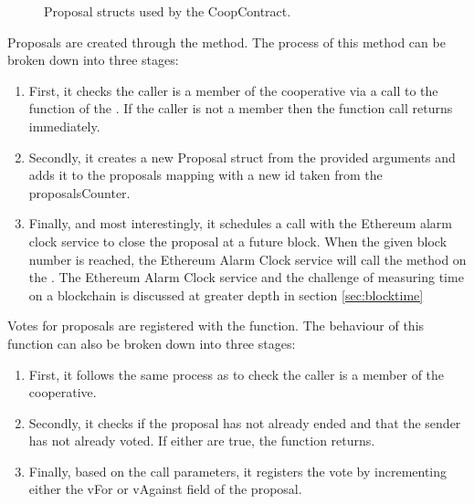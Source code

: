 \begin{figure}
\centering
{}
\decoRule
\caption[Proposal Structs in CoopContract]{Proposal structs used by the CoopContract.}
\label{fig:ProposalStructs}
\end{figure}

Proposals are created through the  method. The process of this method can be broken down into three stages: 
\begin{enumerate}
\item First, it checks the caller is a member of the cooperative via a call to the  function of the . If the caller is not a member then the function call returns immediately. 
\item Secondly, it creates a new Proposal struct from the provided arguments and adds it to the proposals mapping with a new id taken from the proposalsCounter. 
\item Finally, and most interestingly, it schedules a call with the Ethereum alarm clock service to close the proposal at a future block. When the given block number is reached, the Ethereum Alarm Clock service will call the  method on the . The Ethereum Alarm Clock service and the challenge of measuring time on a blockchain is discussed at greater depth in section \ref{sec:blocktime}
\end{enumerate}

Votes for proposals are registered with the  function. The behaviour of this function can also be broken down into three stages:
\begin{enumerate}
\item First, it follows the same process as  to check the caller is a member of the cooperative.
\item Secondly, it checks if the proposal has not already ended and that the sender has not already voted. If either are true, the function returns.
\item Finally, based on the call parameters, it registers the vote by incrementing either the vFor or vAgainst field of the proposal.\\
\end{enumerate}

